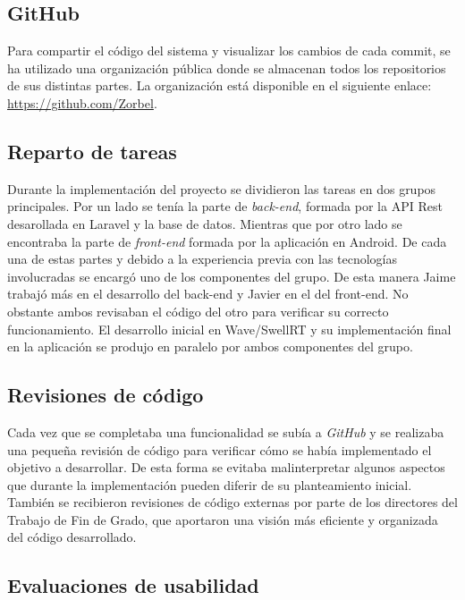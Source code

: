 \subsection{GitHub}

Para compartir el código del sistema y visualizar los cambios de cada commit, se ha utilizado una organización pública donde se almacenan todos los repositorios de sus distintas partes. La organización está disponible en el siguiente enlace: \url{https://github.com/Zorbel}.

\subsection{Reparto de tareas}

Durante la implementación del proyecto se dividieron las tareas en dos grupos principales. Por un lado se tenía la parte de \textit{back-end}, formada por la API Rest desarollada en Laravel y la base de datos. Mientras que por otro lado se encontraba la parte de \textit{front-end} formada por la aplicación en Android. De cada una de estas partes y debido a la experiencia previa con las tecnologías involucradas se encargó uno de los componentes del grupo. De esta manera Jaime trabajó más en el desarrollo del back-end y Javier en el del front-end. No obstante ambos revisaban el código del otro para verificar su correcto funcionamiento. El desarrollo inicial en Wave/SwellRT y su implementación final en la aplicación se produjo en paralelo por ambos componentes del grupo.

\subsection{Revisiones de código}

Cada vez que se completaba una funcionalidad se subía a \textit{GitHub} y se realizaba una pequeña revisión de código para verificar cómo se había implementado el objetivo a desarrollar. De esta forma se evitaba malinterpretar algunos aspectos que durante la implementación pueden diferir de su planteamiento inicial. También se recibieron revisiones de código externas por parte de los directores del Trabajo de Fin de Grado, que aportaron una visión más eficiente y organizada del código desarrollado.


\subsection{Evaluaciones de usabilidad}

